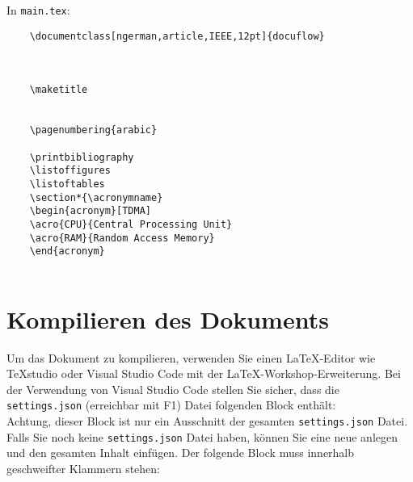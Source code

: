 \noindent In \verb|main.tex|:

\begin{verbatim}
    \documentclass[ngerman,article,IEEE,12pt]{docuflow}


    
    \maketitle
    
    
    \pagenumbering{arabic}
    
    \printbibliography
    \listoffigures
    \listoftables
    \section*{\acronymname}
    \begin{acronym}[TDMA]
    \acro{CPU}{Central Processing Unit}
    \acro{RAM}{Random Access Memory}
    \end{acronym}
    
\end{verbatim}

\clearpage
\section{Kompilieren des Dokuments}\label{settingsjson}

Um das Dokument zu kompilieren, verwenden Sie einen LaTeX-Editor wie TeXstudio oder Visual Studio Code mit der LaTeX-Workshop-Erweiterung. 
Bei der Verwendung von Visual Studio Code stellen Sie sicher, dass die \texttt{settings.json} (erreichbar mit F1) Datei folgenden Block enthält:\\

Achtung, dieser Block ist nur ein Ausschnitt der gesamten \texttt{settings.json} Datei. 
Falls Sie noch keine \texttt{settings.json} Datei haben, können Sie eine neue anlegen und den gesamten Inhalt einfügen. 
Der folgende Block muss innerhalb geschweifter Klammern stehen:




